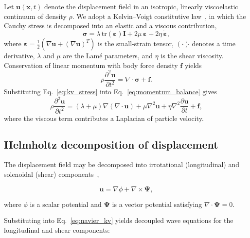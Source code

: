 \documentclass[11pt]{article}
\begin{document}
Let $\mathbf{u}(\mathbf{x},t)$ denote the displacement field in an isotropic,
linearly viscoelastic continuum of density $\rho$. We adopt a Kelvin--Voigt
constitutive law~\cite{catheline2004viscoelastic,ferry1980viscoelasticity}, in which the Cauchy stress is decomposed into an elastic and
a viscous contribution,
\begin{equation}
\boldsymbol{\sigma}
=
\lambda\,\mathrm{tr}(\boldsymbol{\varepsilon})\mathbf{I}
+ 2\mu\,\boldsymbol{\varepsilon}
+ 2\eta\,\dot{\boldsymbol{\varepsilon}},
\label{eq:kv_stress}
\end{equation}
where $\boldsymbol{\varepsilon} = \tfrac{1}{2}\left(\nabla \mathbf{u} + (\nabla \mathbf{u})^T\right)$
is the small-strain tensor, $(\cdot)\dot{}$ denotes a time derivative, $\lambda$ and
$\mu$ are the Lam\'e parameters, and $\eta$ is the shear viscosity. Conservation of
linear momentum with body force density $\mathbf{f}$ yields
\begin{equation}
\rho \frac{\partial^2 \mathbf{u}}{\partial t^2}
=
\nabla\cdot \boldsymbol{\sigma} + \mathbf{f}.
\label{eq:momentum_balance}
\end{equation}
Substituting Eq.~\eqref{eq:kv_stress} into Eq.~\eqref{eq:momentum_balance} gives
\begin{equation}
\rho \frac{\partial^2 \mathbf{u}}{\partial t^2}
=
(\lambda+\mu)\nabla(\nabla\cdot\mathbf{u})
+ \mu \nabla^2\mathbf{u}
+ \eta \nabla^2 \frac{\partial \mathbf{u}}{\partial t}
+ \mathbf{f},
\label{eq:navier_kv}
\end{equation}
where the viscous term contributes a Laplacian of particle velocity.


\subsection{Helmholtz decomposition of displacement}

The displacement field may be decomposed into irrotational (longitudinal) and
solenoidal (shear) components~\cite{auld1973acoustic,graff1991wave},

\begin{equation}
\mathbf{u} = \nabla \phi + \nabla \times \mathbf{\Psi},
\end{equation}

where $\phi$ is a scalar potential and $\mathbf{\Psi}$ is a vector potential
satisfying $\nabla \cdot \mathbf{\Psi} = 0$.

Substituting into Eq.~\eqref{eq:navier_kv} yields decoupled wave equations for the
longitudinal and shear components:
\end{document}
